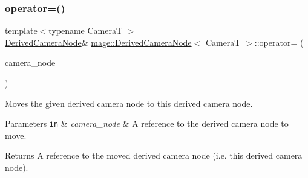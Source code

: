 \subsubsection{\texorpdfstring{operator=()}{operator=()}\hspace{0.1cm}{\footnotesize\ttfamily [2/2]}}
{\footnotesize\ttfamily template$<$typename CameraT $>$ \\
\hyperlink{classmage_1_1_derived_camera_node}{Derived\+Camera\+Node}\& \hyperlink{classmage_1_1_derived_camera_node}{mage\+::\+Derived\+Camera\+Node}$<$ CameraT $>$\+::operator= (\begin{DoxyParamCaption}\item[{\hyperlink{classmage_1_1_derived_camera_node}{Derived\+Camera\+Node}$<$ CameraT $>$ \&\&}]{camera\+\_\+node }\end{DoxyParamCaption})\hspace{0.3cm}{\ttfamily [delete]}}

Moves the given derived camera node to this derived camera node.


\begin{DoxyParams}[1]{Parameters}
\mbox{\tt in}  & {\em camera\+\_\+node} & A reference to the derived camera node to move. \\
\hline
\end{DoxyParams}
\begin{DoxyReturn}{Returns}
A reference to the moved derived camera node (i.\+e. this derived camera node). 
\end{DoxyReturn}
